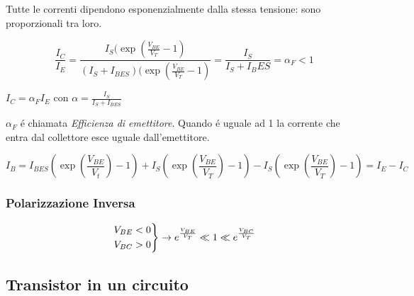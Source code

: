 \documentclass{article}
\begin{document}
Tutte le correnti dipendono esponenzialmente dalla stessa tensione: sono proporzionali tra loro.

\[ \frac{I_C}{I_E} = \frac{I_S (\exp(\frac{V_{BE}}{V_T} -1 )}{(I_S + I_{BES})(\exp(\frac{V_{BE}}{V_T} -1)} = \frac{I_S}{I_S+I_BES} = \alpha_F < 1 \]

$I_C = \alpha_F I_E$ con $\alpha = \frac{I_S}{I_S + I_{BES}}$

$\alpha_F$ \'e chiamata \textit{Efficienza di emettitore}. Quando \'e uguale ad 1 la corrente che entra dal collettore esce uguale dall'emettitore.

\[ I_B = I_{BES}(\exp(\frac{V_{BE}}{V_t}) -1) + I_S (\exp(\frac{V_{BE}}{V_T}) -1) - I_S (\exp(\frac{V_{BE}}{V_T}) -1) = I_E - I_C \]

\subsubsection{Polarizzazione Inversa}
\[
    \begin{rcases}
        V_{BE} < 0\\
        V_{BC} > 0
    \end{rcases} \rightarrow
    e^{\frac{V_{BE}}{V_T}} \ll 1 \ll e^{\frac{V_{BC}}{V_T}}
\]

\subsection{Transistor in un circuito}
\end{document}
